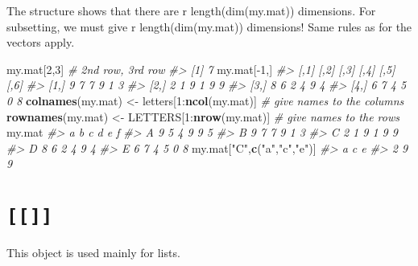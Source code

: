 \documentclass[]{book}
\newenvironment{Shaded}{}{}
\newcommand{\CommentTok}[1]{\textcolor[rgb]{0.38,0.63,0.69}{\textit{#1}}}
\newcommand{\DecValTok}[1]{\textcolor[rgb]{0.25,0.63,0.44}{#1}}
\newcommand{\KeywordTok}[1]{\textcolor[rgb]{0.00,0.44,0.13}{\textbf{#1}}}
\newcommand{\NormalTok}[1]{#1}
\newcommand{\OperatorTok}[1]{\textcolor[rgb]{0.40,0.40,0.40}{#1}}
\newcommand{\StringTok}[1]{\textcolor[rgb]{0.25,0.44,0.63}{#1}}
\theoremstyle{definition}
\theoremstyle{definition}
\theoremstyle{definition}
\theoremstyle{remark}
\begin{document}
The structure shows that there are r length(dim(my.mat)) dimensions. For
subsetting, we must give r length(dim(my.mat)) dimensions! Same rules as
for the vectors apply.

\begin{Shaded}
\begin{Highlighting}[]
\NormalTok{my.mat[}\DecValTok{2}\NormalTok{,}\DecValTok{3}\NormalTok{] }\CommentTok{# 2nd row, 3rd row}
\CommentTok{#> [1] 7}
\NormalTok{my.mat[}\OperatorTok{-}\DecValTok{1}\NormalTok{,]}
\CommentTok{#>      [,1] [,2] [,3] [,4] [,5] [,6]}
\CommentTok{#> [1,]    9    7    7    9    1    3}
\CommentTok{#> [2,]    2    1    9    1    9    9}
\CommentTok{#> [3,]    8    6    2    4    9    4}
\CommentTok{#> [4,]    6    7    4    5    0    8}
\KeywordTok{colnames}\NormalTok{(my.mat) <-}\StringTok{ }\NormalTok{letters[}\DecValTok{1}\OperatorTok{:}\KeywordTok{ncol}\NormalTok{(my.mat)] }\CommentTok{# give names to the columns}
\KeywordTok{rownames}\NormalTok{(my.mat) <-}\StringTok{ }\NormalTok{LETTERS[}\DecValTok{1}\OperatorTok{:}\KeywordTok{nrow}\NormalTok{(my.mat)] }\CommentTok{# give names to the rows}
\NormalTok{my.mat}
\CommentTok{#>   a b c d e f}
\CommentTok{#> A 9 5 4 9 9 5}
\CommentTok{#> B 9 7 7 9 1 3}
\CommentTok{#> C 2 1 9 1 9 9}
\CommentTok{#> D 8 6 2 4 9 4}
\CommentTok{#> E 6 7 4 5 0 8}
\NormalTok{my.mat[}\StringTok{"C"}\NormalTok{,}\KeywordTok{c}\NormalTok{(}\StringTok{"a"}\NormalTok{,}\StringTok{"c"}\NormalTok{,}\StringTok{"e"}\NormalTok{)]}
\CommentTok{#> a c e }
\CommentTok{#> 2 9 9}
\end{Highlighting}
\end{Shaded}

\hypertarget{section-1}{%
\section{\texorpdfstring{\texttt{{[}{[}{]}{]}}}{{[}{[}{]}{]}}}\label{section-1}}

This object is used mainly for lists.
\end{document}
